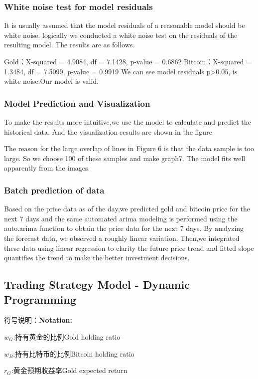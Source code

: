 \documentclass{mcmthesis}
\begin{document}
\subsubsection{White noise test for model residuals}
It is usually assumed that the model residuals of a reasonable model should be white noise.
logically we conducted a white noise test on the residuals of the resulting model.
The results are as follows.

Gold：X-squared = 4.9084, df = 7.1428, p-value = 0.6862
Bitcoin：X-squared = 1.3484, df = 7.5099, p-value = 0.9919
We can see model residuals p>0.05, is white noise.Our model is valid.


\subsubsection{Model Prediction and Visualization}
To make the results more intuitive,we use the model to calculate and predict the historical data. 
And the visualization results are shown in the figure

The reason for the large overlap of lines in Figure 6 is that the data sample is too large.
So we choose 100 of these samples and make graph7.
The model fits well apparently from the images.


\subsubsection{Batch prediction of data}   %
Based on the price data as of the day,we predicted gold and bitcoin price for the next 7 days 
and the same automated arima modeling is performed using the auto.arima function to obtain the price data for the next 7 days.
By analyzing the forecast data, we observed a roughly linear variation. 
Then,we integrated these data using linear regression to clarity the future price trend 
and fitted slope quantifies the trend to make the better investment decisions.



\subsection{Trading Strategy Model - Dynamic Programming }
符号说明：\textbf{Notation:}

$w_G$:持有黄金的比例Gold holding ratio

$w_B$:持有比特币的比例Bitcoin holding ratio

$r_G$:黄金预期收益率Gold expected return
\end{document}
